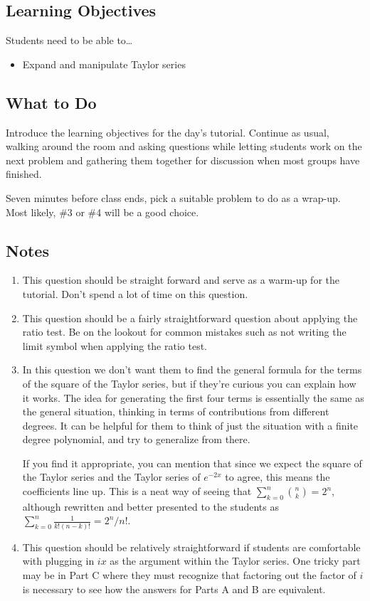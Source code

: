 \subsection*{Learning Objectives} Students need to be able to\ldots
	\begin{itemize}
		\item Expand and manipulate Taylor series
	\end{itemize}

\subsection*{What to Do} 
Introduce the learning objectives for the day's tutorial.
	Continue as usual, walking around the room and asking questions while letting students work on the next problem and gathering them together for discussion when most groups have finished.
    
    Seven minutes before class ends, pick a suitable problem to do as a wrap-up. Most likely, \#3 or \#4 will be a good choice.

\subsection*{Notes}
		\begin{enumerate}
			\item This question should be straight forward and serve
				as a warm-up for the tutorial. Don't spend a lot
				of time on this question.
			\item This question should be a fairly straightforward question about applying the ratio test. Be on the lookout for common mistakes such as not writing the limit symbol when applying the ratio test.

            \item In this question we don't want them to find the general formula for the terms of the square of the Taylor series, but if they're curious you can explain how it works. The idea for generating the first four terms is essentially the same as the general situation, thinking in terms of contributions from different degrees. It can be helpful for them to think of just the situation with a finite degree polynomial, and try to generalize from there. 

            If you find it appropriate, you can mention that since we expect the square of the Taylor series and the Taylor series of $e^{-2x}$ to agree, this means the coefficients line up. This is a neat way of seeing that $\sum_{k=0}^n {n \choose k} = 2^n$, although rewritten and better presented to the students as  $\sum_{k=0}^n \frac{1}{k!(n-k)!} = 2^n/n!$.
            
			\item This question should be relatively straightforward if students are comfortable with plugging in $ix$ as the argument within the Taylor series. One tricky part may be in Part C where they must recognize that factoring out the factor of $i$ is necessary to see how the answers for Parts A and B are equivalent.
		\end{enumerate}
